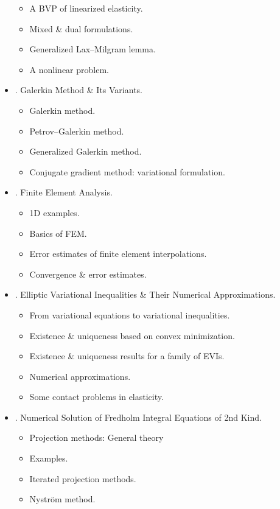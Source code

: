 \documentclass{article}
\begin{document}
\begin{itemize}
\begin{itemize}
		\item {\sf A BVP of linearized elasticity.}
		\item {\sf Mixed \& dual formulations.}
		\item {\sf Generalized Lax--Milgram lemma.}
		\item {\sf A nonlinear problem.}
	\end{itemize}
	\item {. Galerkin Method \& Its Variants.}
	\begin{itemize}
		\item {\sf Galerkin method.}
		\item {\sf Petrov--Galerkin method.}
		\item {\sf Generalized Galerkin method.}
		\item {\sf Conjugate gradient method: variational formulation.}
	\end{itemize}
	\item {. Finite Element Analysis.}
	\begin{itemize}
		\item {\sf1D examples.}
		\item {\sf Basics of FEM.}
		\item {\sf Error estimates of finite element interpolations.}
		\item {\sf Convergence \& error estimates.}
	\end{itemize}
	\item {. Elliptic Variational Inequalities \& Their Numerical Approximations.}
	\begin{itemize}
		\item {\sf From variational equations to variational inequalities.}
		\item {\sf Existence \& uniqueness based on convex minimization.}
		\item {\sf Existence \& uniqueness results for a family of EVIs.}
		\item {\sf Numerical approximations.}
		\item {\sf Some contact problems in elasticity.}
	\end{itemize}
	\item {. Numerical Solution of Fredholm Integral Equations of 2nd Kind.}
	\begin{itemize}
		\item {\sf Projection methods: General theory}
		\item {\sf Examples.}
		\item {\sf Iterated projection methods.}
		\item {\sf Nystr\"om method.}

\end{itemize}
\end{itemize}
\end{document}
